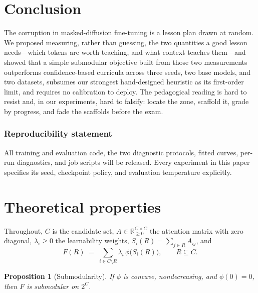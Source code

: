\documentclass{article} %
\newtheorem{proposition}{Proposition}
\begin{document}
\section{Conclusion}

The corruption in masked-diffusion fine-tuning is a lesson plan drawn at random. We proposed measuring, rather than guessing, the two quantities a good lesson needs---which tokens are worth teaching, and what context teaches them---and showed that a simple submodular objective built from those two measurements outperforms confidence-based curricula across three seeds, two base models, and two datasets, subsumes our strongest hand-designed heuristic as its first-order limit, and requires no calibration to deploy. The pedagogical reading is hard to resist and, in our experiments, hard to falsify: locate the zone, scaffold it, grade by progress, and fade the scaffolds before the exam.

\subsubsection*{Reproducibility statement}
All training and evaluation code, the two diagnostic protocols, fitted curves, per-run diagnostics, and job scripts will be released. Every experiment in this paper specifies its seed, checkpoint policy, and evaluation temperature explicitly.




\appendix

\section{Theoretical properties}
\label{app:theory}

Throughout, $C$ is the candidate set, $A \in \mathbb{R}_{\geq 0}^{C \times C}$ the attention matrix with zero diagonal, $\lambda_i \geq 0$ the learnability weights, $S_i(R) = \sum_{j \in R} A_{ij}$, and
\[
F(R) \;=\; \sum_{i \in C \setminus R} \lambda_i\, \phi\big(S_i(R)\big), \qquad R \subseteq C .
\]

\begin{proposition}[Submodularity]
\label{prop:submodular}
If $\phi$ is concave, nondecreasing, and $\phi(0) = 0$, then $F$ is submodular on $2^C$.
\end{proposition}
\end{document}
